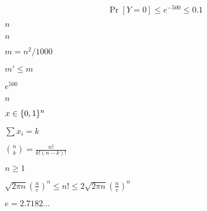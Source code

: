 \documentclass[10pt]{book}
\begin{document}
\begin{mdSnippets}
\begin{mdDisplaySnippet}[e6fa94618272f57c7cf6d1eea8ab6a87]
\[%
\Pr[Y = 0] \leq e^{-500} \leq 0.1
\]%
\end{mdDisplaySnippet}%
\begin{mdInlineSnippet}[7b8b965ad4bca0e41ab51de7b31363a1]%
$n$\end{mdInlineSnippet}%
\begin{mdInlineSnippet}[7b8b965ad4bca0e41ab51de7b31363a1]%
$n$\end{mdInlineSnippet}%
\begin{mdInlineSnippet}%
$m = n^2/1000$\end{mdInlineSnippet}%
\begin{mdInlineSnippet}[affee6c47176e0792704ee3b4673dc8c]%
$m' \leq m$\end{mdInlineSnippet}%
\begin{mdInlineSnippet}[be6ef5dbd61b786b08e6d695e60a335e]%
$e^{500}$\end{mdInlineSnippet}%
\begin{mdInlineSnippet}[7b8b965ad4bca0e41ab51de7b31363a1]%
$n$\end{mdInlineSnippet}%
\begin{mdInlineSnippet}[cc927a52f8d88c7f8d09d1be36733f68]%
$x \in \{0,1\}^n$\end{mdInlineSnippet}%
\begin{mdInlineSnippet}%
$\sum x_i = k$\end{mdInlineSnippet}%
\begin{mdInlineSnippet}[6b6e1fb712e743077783f051b45d28a4]%
$\binom{n}{k} = \tfrac{n!}{k!(n-k)!}$\end{mdInlineSnippet}%
\begin{mdInlineSnippet}[fe37f48a6bb040c06c5e7ccaac63bc66]%
$n\geq 1$\end{mdInlineSnippet}%
\begin{mdInlineSnippet}[648f7ec84949dc420370a381524dea77]%
$\sqrt{2\pi n}\left(\tfrac{n}{e}\right)^n \leq n! \leq 2\sqrt{2\pi n}\left(\tfrac{n}{e}\right)^n $\end{mdInlineSnippet}%
\begin{mdInlineSnippet}%
$e=2.7182\ldots$\end{mdInlineSnippet}%

\end{mdSnippets}
\end{document}

